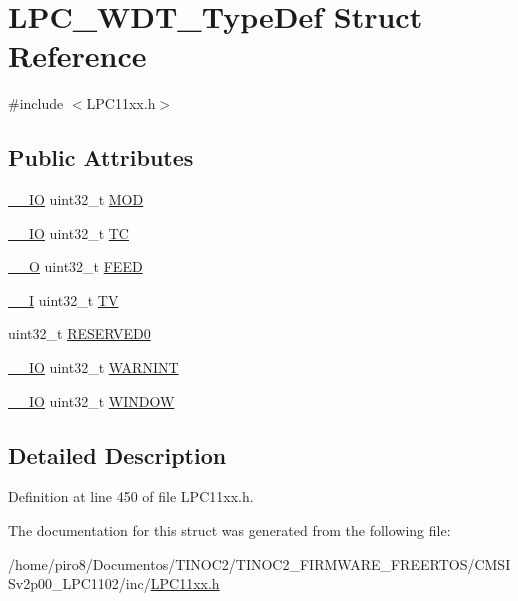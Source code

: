 \hypertarget{struct_l_p_c___w_d_t___type_def}{}\section{L\+P\+C\+\_\+\+W\+D\+T\+\_\+\+Type\+Def Struct Reference}
\label{struct_l_p_c___w_d_t___type_def}


{\ttfamily \#include $<$L\+P\+C11xx.\+h$>$}

\subsection*{Public Attributes}
\begin{DoxyCompactItemize}
\item 
\hyperlink{group___c_m_s_i_s__core__definitions_gaec43007d9998a0a0e01faede4133d6be}{\+\_\+\+\_\+\+IO} uint32\+\_\+t \hyperlink{group___l_p_c11xx___definitions_ga5112fe2fb4a591ff3310a2eb08e28a47}{M\+OD}
\item 
\hyperlink{group___c_m_s_i_s__core__definitions_gaec43007d9998a0a0e01faede4133d6be}{\+\_\+\+\_\+\+IO} uint32\+\_\+t \hyperlink{group___l_p_c11xx___definitions_gac88d8aa857d093999d12de4a3d97065f}{TC}
\item 
\hyperlink{group___c_m_s_i_s__core__definitions_ga7e25d9380f9ef903923964322e71f2f6}{\+\_\+\+\_\+O} uint32\+\_\+t \hyperlink{group___l_p_c11xx___definitions_ga6a47b06c1daa5f07ba8c62127414f5f6}{F\+E\+ED}
\item 
\hyperlink{group___c_m_s_i_s__core__definitions_gaf63697ed9952cc71e1225efe205f6cd3}{\+\_\+\+\_\+I} uint32\+\_\+t \hyperlink{group___l_p_c11xx___definitions_ga6788dee11cb43f56bcfdde5bf58b98b0}{TV}
\item 
uint32\+\_\+t \hyperlink{group___l_p_c11xx___definitions_ga4f673a98b4eccd3c144c68c17c04bc41}{R\+E\+S\+E\+R\+V\+E\+D0}
\item 
\hyperlink{group___c_m_s_i_s__core__definitions_gaec43007d9998a0a0e01faede4133d6be}{\+\_\+\+\_\+\+IO} uint32\+\_\+t \hyperlink{group___l_p_c11xx___definitions_gab3fd0a78f0582b2905bb674a562fdd9d}{W\+A\+R\+N\+I\+NT}
\item 
\hyperlink{group___c_m_s_i_s__core__definitions_gaec43007d9998a0a0e01faede4133d6be}{\+\_\+\+\_\+\+IO} uint32\+\_\+t \hyperlink{group___l_p_c11xx___definitions_gac636e5c9a75e0818b102050ef7f5f23c}{W\+I\+N\+D\+OW}
\end{DoxyCompactItemize}


\subsection{Detailed Description}


Definition at line 450 of file L\+P\+C11xx.\+h.



The documentation for this struct was generated from the following file\+:\begin{DoxyCompactItemize}
\item 
/home/piro8/\+Documentos/\+T\+I\+N\+O\+C2/\+T\+I\+N\+O\+C2\+\_\+\+F\+I\+R\+M\+W\+A\+R\+E\+\_\+\+F\+R\+E\+E\+R\+T\+O\+S/\+C\+M\+S\+I\+Sv2p00\+\_\+\+L\+P\+C1102/inc/\hyperlink{_l_p_c11xx_8h}{L\+P\+C11xx.\+h}\end{DoxyCompactItemize}

